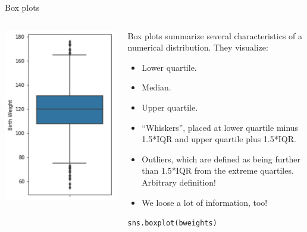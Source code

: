 \documentclass[aspectratio=169]{../latex_main/tntbeamer}  %
\begin{document}
	
	\begin{frame}{Box plots}
	     \begin{columns}
            \begin{column}{.5\textwidth}
            
                       \includegraphics[scale=.5]{Bild38}

            \end{column}
            
            
            \begin{column}{.5\textwidth}
                Box plots summarize several characteristics of a numerical distribution. They visualize:
                \begin{itemize}
                    \item Lower quartile.
                    \item Median.
                    \item Upper quartile.
                    \item “Whiskers”, placed at lower quartile minus 1.5*IQR and upper quartile plus 1.5*IQR.
                    \item Outliers, which are defined as being further than 1.5*IQR from the extreme quartiles. \alert{Arbitrary definition!}
                    \item We loose a lot of information, too!
                \end{itemize}
                \texttt{sns.boxplot(bweights)}

            \end{column}
        \end{columns}
	\end{frame}
	
\end{document}
